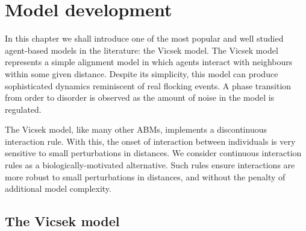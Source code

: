 \graphicspath{{fig/model_development/}}

\chapter{Model development}
\label{cha:model_dev}

In this chapter we shall introduce one of the most popular and well studied agent-based
models in the literature: the Vicsek model. The Vicsek model represents a simple alignment
model in which agents interact with neighbours within some given distance. Despite its
simplicity, this model can produce sophisticated dynamics reminiscent of real flocking
events. A phase transition from order to disorder is observed as the amount of noise in
the model is regulated.

The Vicsek model, like many other ABMs, implements a discontinuous interaction rule. With
this, the onset of interaction between individuals is very sensitive to small perturbations
in distances. We consider continuous interaction rules as a biologically-motivated
alternative. Such rules ensure interactions are more robust to small perturbations in
distances, and without the penalty of additional model complexity.

\section{The Vicsek model}

